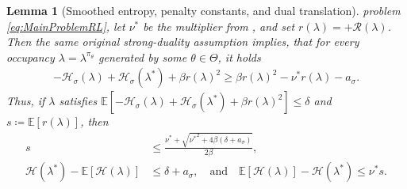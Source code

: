 \documentclass[10pt,a4paper]{amsart}
\providecommand{\Exp}[1]{{ \mathbb{E}}\!\left[#1\right]}
\def\HH{{\mathcal{H}}}
\def\Reg{{\mathcal{R}}}
\providecommand{\define}{\coloneqq}
\def\nuOpt{{\nu^{*}}}
\DeclarePairedDelimiter{\plus}{[}{]_{+}}
\theoremstyle{plain}
\newtheorem{lemma}[theorem]{Lemma}
\theoremstyle{definition}
\theoremstyle{remark}
\begin{document}
\begin{lemma}[Smoothed entropy, penalty constants, and dual translation]
 problem \eqref{eq:MainProblemRL}, let $\nuOpt$ be the multiplier from
 , and set $r(\lambda)=\plus{\Reg(\lambda)}$.
 Then the same original strong-duality assumption implies, that for every
 occupancy $\lambda=\lambda^{\pi_\theta}$ generated by some
 $\theta\in\Theta$, it holds
 \begin{align}
  -\HH_\sigma(\lambda)+\HH_\sigma(\lambda^*)
  +\beta r(\lambda)^2
  \geq\beta r(\lambda)^2-\nuOpt r(\lambda)-a_\sigma.
  \label{eq:SmoothedPenaltyDualLowerBound}
 \end{align}
 Thus, if $\lambda$ satisfies
 $\Exp{-\HH_\sigma(\lambda)+\HH_\sigma(\lambda^*)
   +\beta r(\lambda)^2}\leq\delta$ and
 $s\define\Exp{r(\lambda)}$, then
 \begin{align}
  s
   & \leq\frac{\nuOpt+
   \sqrt{\nuOpt^2+4\beta(\delta+a_\sigma)}}{2\beta},
  \label{eq:SmoothedConstraintTranslation}       \\
  \HH(\lambda^*)-\Exp{\HH(\lambda)}
   & \leq\delta+a_\sigma, \quad \text{and} \quad
  \Exp{\HH(\lambda)}-\HH(\lambda^*)
  \leq\nuOpt s.
  \label{eq:SmoothedObjectiveTranslation}
 \end{align}
\end{lemma}
\end{document}

